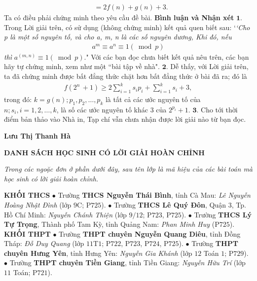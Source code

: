 \begin{multicols}{2}
\begin{align*}
		&= 2f\left( n \right) + g\left( n \right) + 3.
	\end{align*}
	Ta có điều phải chứng minh theo yêu cầu đề bài.
	\vskip 0.05cm
	\textbf{\color{thachthuctoanhoc}Bình luận và Nhận xét}
	\vskip 0.05cm
	$\pmb{1.}$ Trong Lời giải trên, có sử dụng (không chứng minh) kết quả quen biết sau:
	\vskip 0.05cm
	`\textit{`Cho p là một số nguyên tố, và cho a, m, n là các số nguyên dương,   Khi đó, nếu
	\begin{align*}
		{a^m} \equiv {a^n} \equiv 1\left( {\bmod p} \right)
	\end{align*}
	thì}  ${a^{\left( {m,n} \right)}} \equiv 1\left( {\bmod p} \right).$"
	\vskip 0.05cm
	Với các bạn đọc chưa biết kết quả nêu trên, các bạn hãy tự chứng minh, xem như một ``bài tập về nhà".
	\vskip 0.05cm
	$\pmb{2.}$ Dễ thấy, với Lời giải trên, ta đã chứng minh được bất đẳng thức chặt hơn bất đẳng thức ở bài đã ra; đó là
	\begin{align*}
		f\left( {{2^n}\, + 1} \right) \ge 2\sum\limits_{i = 1}^k {{s_i}{p_i}}  + \sum\limits_{i = 1}^k {{s_i}}  + 3,
	\end{align*}
	trong đó: $k = g(n); p_1, p_2,\ldots,p_k$  là tất cả các ước nguyên tố của $n; s_i,  i = 1, 2, \ldots, k$, là số các ước nguyên tố khác $3$ của ${2^{{p_i}}} + 1.$
	\vskip 0.05cm
	$\pmb{3.}$ Cho tới thời điểm bản thảo vào Nhà in, Tạp chí vẫn chưa nhận được lời giải nào từ bạn đọc.
	\begin{flushright}
		\textbf{\color{thachthuctoanhoc}Lưu Thị Thanh Hà}
	\end{flushright}
\end{multicols}
\begin{center}
	\textbf{\color{thachthuctoanhoc}DANH SÁCH HỌC SINH CÓ LỜI GIẢI HOÀN CHỈNH}
\end{center}
\textit{Trong các ngoặc đơn ở phần dưới đây, sau tên lớp là mã hiệu của các bài toán mà học sinh có lời giải hoàn chỉnh.}
\begin{multicols}{2}
	\textbf{\color{thachthuctoanhoc}KHỐI THCS}
	\vskip 0.05cm
	$\bullet$ Trường \textbf{\color{thachthuctoanhoc}THCS Nguyễn Thái Bình}, tỉnh Cà Mau: \textit{Lê Nguyễn Hoàng Nhật Đình} (lớp $9$C; P$725$).
	\vskip 0.05cm
	$\bullet$ Trường \textbf{\color{thachthuctoanhoc}THCS Lê Quý Đôn}, Quận $3$, Tp. Hồ Chí Minh: \textit{Nguyễn Chánh Thiện} (lớp $9/12$; P$723$, P$725$).
	\vskip 0.05cm
	$\bullet$ Trường \textbf{\color{thachthuctoanhoc}THCS Lý Tự Trọng}, Thành phố Tam Kỳ, tỉnh Quảng Nam: \textit{Phan Minh Huy} (P$725$).
	\vskip 0.05cm
	\textbf{\color{thachthuctoanhoc}KHỐI THPT}
	\vskip 0.05cm
	$\bullet$ Trường \textbf{\color{thachthuctoanhoc}THPT chuyên Nguyễn Quang Diêu}, tỉnh Đồng Tháp: \textit{Đỗ Duy Quang} (lớp $11$T$1$; P$722$, P$723$, P$724$, P$725$).
	\vskip 0.05cm
	$\bullet$ Trường \textbf{\color{thachthuctoanhoc}THPT chuyên Hưng Yên}, tỉnh Hưng Yên: \textit{Nguyễn Gia Khánh} (lớp $12$ Toán $1$; P$729$).
	\vskip 0.05cm
	$\bullet$ Trường \textbf{\color{thachthuctoanhoc}THPT chuyên Tiền Giang}, tỉnh Tiền Giang: \textit{Nguyễn Hữu Trí} (lớp $11$ Toán; P$721$).
\end{multicols}
